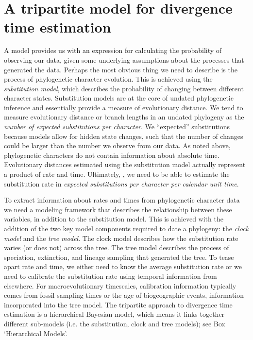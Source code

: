 \section{A tripartite model for divergence time estimation}
 
A model provides us with an expression for calculating the probability of observing our data, given some underlying assumptions about the processes that generated the data. 
Perhaps the most obvious thing we need to describe is the process of phylogenetic character evolution.
This is achieved  using the \textit{substitution model}, which describes the probability of changing between different character states.
Substitution models are at the core of undated phylogenetic inference and essentially provide a measure of evolutionary distance.
We tend to measure evolutionary distance or branch lengths in an undated phylogeny as the \textit{number of expected substitutions per character}. We  ``expected'' substitutions because models allow for hidden state changes, such that the number of changes could be larger than the number we observe from our data.
As noted above, phylogenetic characters do not contain information about absolute time. Evolutionary distances estimated using the substitution model actually represent a product of rate and time.
Ultimately, , we need to be able to estimate the substitution rate in \textit{expected substitutions per character per calendar unit time}.

To extract information about rates and times from phylogenetic character data we need a modeling framework that describes the  relationship between these variables, in addition to the substitution model.
This is achieved with the addition of the two key model components required to date a phylogeny: the \textit{clock model} and the \textit{tree model}.
The clock model describes how the substitution rate varies (or does not) across the tree.
The tree model describes the process of speciation, extinction, and lineage sampling that generated the tree.
To tease apart rate and time, we either need to know the average substitution rate or we need to calibrate the substitution rate using temporal information from elsewhere.
For macroevolutionary timescales, calibration information typically comes from fossil sampling times or the age of biogeographic events, information incorporated into the tree model.
The tripartite approach to divergence time estimation is a hierarchical Bayesian model, which means it links together different sub-models (i.e. the substitution, clock and tree models); see Box `Hierarchical Models'.


